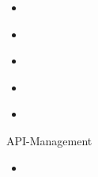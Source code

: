 \begin{flashcard}[]{}
  \begin{itemize}
    \item
  \end{itemize}
\end{flashcard}

\begin{flashcard}[]{}
  \begin{itemize}
    \item
  \end{itemize}
\end{flashcard}

\begin{flashcard}[]{}
  \begin{itemize}
    \item
  \end{itemize}
\end{flashcard}

\begin{flashcard}[]{}
  \begin{itemize}
    \item
  \end{itemize}
\end{flashcard}



\begin{flashcard}[]{}
  \begin{itemize}
    \item
  \end{itemize}
\end{flashcard}


\begin{flashcard}[]{API-Management}
  \begin{itemize}
    \item
  \end{itemize}
\end{flashcard}

